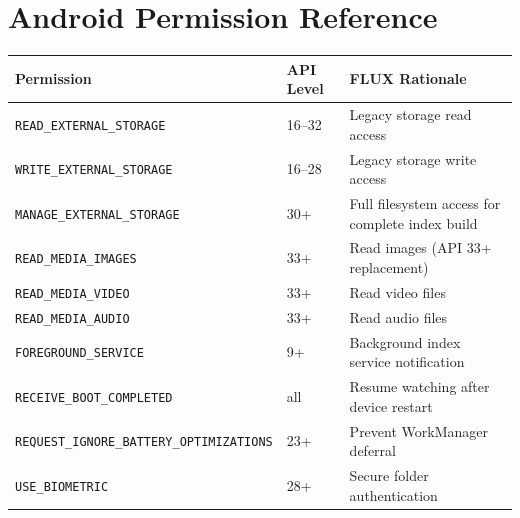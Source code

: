 \chapter{Android Permission Reference}

\begin{longtable}{@{}p{64mm}p{22mm}p{55mm}@{}}
\toprule
\textbf{Permission} & \textbf{API Level} & \textbf{FLUX Rationale} \\
\midrule
\texttt{READ\_EXTERNAL\_STORAGE} & 16--32 & Legacy storage read access \\
\texttt{WRITE\_EXTERNAL\_STORAGE} & 16--28 & Legacy storage write access \\
\texttt{MANAGE\_EXTERNAL\_STORAGE} & 30+ & Full filesystem access for complete index build \\
\texttt{READ\_MEDIA\_IMAGES} & 33+ & Read images (API 33+ replacement) \\
\texttt{READ\_MEDIA\_VIDEO} & 33+ & Read video files \\
\texttt{READ\_MEDIA\_AUDIO} & 33+ & Read audio files \\
\texttt{FOREGROUND\_SERVICE} & 9+ & Background index service notification \\
\texttt{RECEIVE\_BOOT\_COMPLETED} & all & Resume watching after device restart \\
\texttt{REQUEST\_IGNORE\_BATTERY\_OPTIMIZATIONS} & 23+ & Prevent WorkManager deferral \\
\texttt{USE\_BIOMETRIC} & 28+ & Secure folder authentication \\
\bottomrule
\end{longtable}
